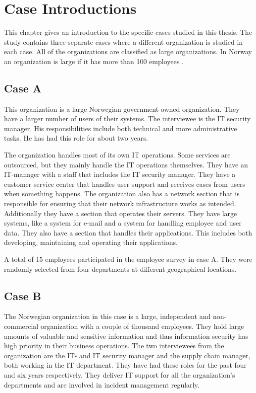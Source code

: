 \chapter{Case Introductions}
\label{chp:CaseIntroductions}
This chapter gives an introduction to the specific cases studied in this thesis. The study contains three separate cases where a different organization is studied in each case. All of the organizations are classified as large organizations. In Norway an organization is large if it has more than 100 employees \cite{SMB}.

\section{Case A}
This organization is a large Norwegian government-owned organization. They have a larger number of users of their systems. The interviewee is the IT security manager. His responsibilities include both technical and more administrative tasks. He has had this role for about two years.

The organization handles most of its own IT operations. Some services are outsourced, but they mainly handle the IT operations themselves. They have an IT-manager with a staff that includes the IT security manager. They have a customer service center %
that handles user support and receives cases from users when something happens. The organization also has a network section that is responsible for ensuring that their network infrastructure works as intended. Additionally they have a section that operates their servers. They have large systems, like a system for e-mail and a system for handling employee and user data. They also have a section that handles their applications. This includes both developing, maintaining and operating their applications.

A total of 15 employees participated in the employee survey in case A. They were randomly selected from four departments at different geographical locations. 

\section{Case B}
The Norwegian organization in this case is a large, independent and non-commercial organization with a couple of thousand employees. They hold large amounts of valuable and sensitive information and thus information security has high priority in their business operations. The two interviewees from the organization are the IT- and IT security manager and the supply chain manager, both working in the IT department. They have had these roles for the past four and six years respectively. They deliver IT support for all the organization's departments and are involved in incident management regularly.   

